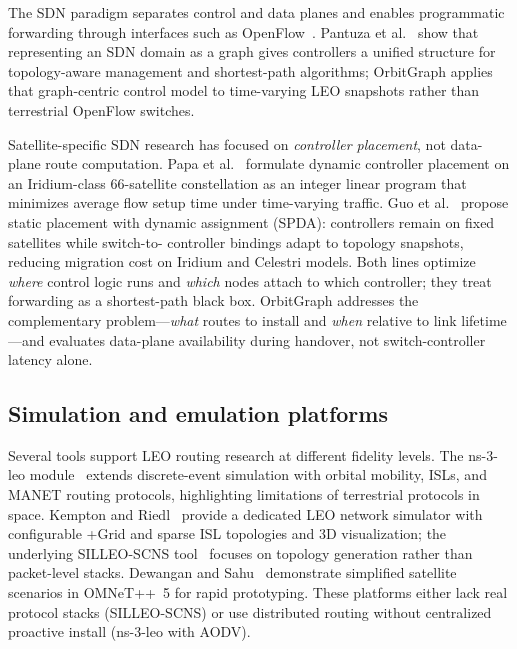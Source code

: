The SDN paradigm separates control and data planes and enables programmatic
forwarding through interfaces such as OpenFlow~\cite{10.1145/1355734.1355746}.
Pantuza et al.~\cite{7014202} show that representing an SDN domain as a graph
gives controllers a unified structure for topology-aware management and
shortest-path algorithms; OrbitGraph applies that graph-centric control model
to time-varying LEO snapshots rather than terrestrial OpenFlow switches.

Satellite-specific SDN research has focused on \emph{controller placement},
not data-plane route computation.
Papa et al.~\cite{papa:sdn-cpp:2018} formulate dynamic controller placement on
an Iridium-class 66-satellite constellation as an integer linear program that
minimizes average flow setup time under time-varying traffic.
Guo et al.~\cite{guo:spda:2022} propose static placement with dynamic
assignment (SPDA): controllers remain on fixed satellites while switch-to-
controller bindings adapt to topology snapshots, reducing migration cost on
Iridium and Celestri models.
Both lines optimize \emph{where} control logic runs and \emph{which} nodes attach
to which controller; they treat forwarding as a shortest-path black box.
OrbitGraph addresses the complementary problem---\emph{what} routes to install
and \emph{when} relative to link lifetime---and evaluates data-plane availability
during handover, not switch-controller latency alone.

\subsection{Simulation and emulation platforms}

Several tools support LEO routing research at different fidelity levels.
The ns-3-leo module~\cite{ns3leo2022} extends discrete-event simulation with
orbital mobility, ISLs, and MANET routing protocols, highlighting limitations
of terrestrial protocols in space.
Kempton and Riedl~\cite{kempton:network-simulator:2021} provide a dedicated
LEO network simulator with configurable +Grid and sparse ISL topologies and
3D visualization; the underlying SILLEO-SCNS tool~\cite{kempton2020silleo,
online:silleo:2025} focuses on topology generation rather than packet-level
stacks.
Dewangan and Sahu~\cite{dewangan:simple-omnet:2017} demonstrate simplified
satellite scenarios in OMNeT++~5 for rapid prototyping.
These platforms either lack real protocol stacks (SILLEO-SCNS) or use
distributed routing without centralized proactive install (ns-3-leo with AODV).

